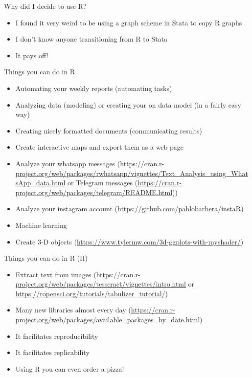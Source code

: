 \documentclass{beamer}
\begin{document}
\begin{frame}{Why did I decide to use R?}
\begin{itemize}[<+->]
\item I found it very weird to be using a graph scheme in Stata to copy R graphs
\item I don't know anyone transitioning from R to Stata
\item It pays off!
 \end{itemize} 
\end{frame}

\begin{frame}{Things you can do in R}
\begin{itemize}[<+->]
\item Automating your weekly reports (automating tasks)
\item Analyzing data (modeling) or creating your on data model (in a fairly easy way)
\item Creating nicely formatted documents (communicating results)
\item Create interactive maps and export them as a web page
\item Analyze your whatsapp messages (\url{https://cran.r-project.org/web/packages/rwhatsapp/vignettes/Text_Analysis_using_WhatsApp_data.html} or Telegram messages (\url{https://cran.r-project.org/web/packages/telegram/README.html}))
\item Analyze your instagram account (\url{https://github.com/pablobarbera/instaR})
\item Machine learning
\item Create 3-D objects (\url{https://www.tylermw.com/3d-ggplots-with-rayshader/})
 \end{itemize} 
\end{frame}

\begin{frame}{Things you can do in R (II)}
\begin{itemize}[<+->]
\item Extract text from images (\url{https://cran.r-project.org/web/packages/tesseract/vignettes/intro.html} or \url{https://ropensci.org/tutorials/tabulizer_tutorial/})
\item Many new libraries almost every day (\url{https://cran.r-project.org/web/packages/available_packages_by_date.html})
\item It facilitates reproducibility
\item It facilitates replicability
\item Using R you can even order a pizza!
 \end{itemize} 
\end{frame}
\end{document}
